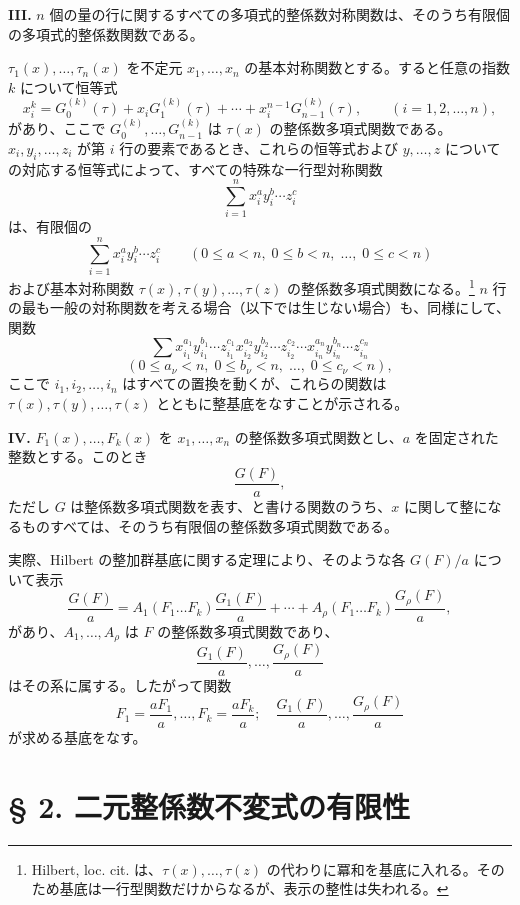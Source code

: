 \textbf{III.} \(n\) 個の量の行に関するすべての多項式的整係数対称関数は、そのうち有限個の多項式的整係数関数である。

\(\tau_1(x),\ldots,\tau_n(x)\) を不定元 \(x_1,\ldots,x_n\) の基本対称関数とする。すると任意の指数 \(k\) について恒等式
\[
        x_i^k = G_0^{(k)}(\tau)+x_iG_1^{(k)}(\tau)+\cdots+x_i^{n-1}G_{n-1}^{(k)}(\tau),
        \qquad (i=1,2,\ldots,n),
\]
があり、ここで \(G_0^{(k)},\ldots,G_{n-1}^{(k)}\) は \(\tau(x)\) の整係数多項式関数である。\(x_i,y_i,\ldots,z_i\) が第 \(i\) 行の要素であるとき、これらの恒等式および \(y,\ldots,z\) についての対応する恒等式によって、すべての特殊な一行型対称関数
\[
        \sum_{i=1}^n x_i^{a}y_i^{b}\cdots z_i^{c}
\]
は、有限個の
\[
        \sum_{i=1}^n x_i^{a}y_i^{b}\cdots z_i^{c}
        \qquad
        (0\le a<n,\;0\le b<n,\;\ldots,\;0\le c<n)
\]
および基本対称関数 \(\tau(x),\tau(y),\ldots,\tau(z)\) の整係数多項式関数になる。\footnote{Hilbert, loc. cit. は、\(\tau(x),\ldots,\tau(z)\) の代わりに冪和を基底に入れる。そのため基底は一行型関数だけからなるが、表示の整性は失われる。}
\(n\) 行の最も一般の対称関数を考える場合（以下では生じない場合）も、同様にして、関数
\[
        \sum x_{i_1}^{a_1}y_{i_1}^{b_1}\cdots z_{i_1}^{c_1}
              x_{i_2}^{a_2}y_{i_2}^{b_2}\cdots z_{i_2}^{c_2}
              \cdots
              x_{i_n}^{a_n}y_{i_n}^{b_n}\cdots z_{i_n}^{c_n}
\]
\[
        (0\le a_\nu<n,\;0\le b_\nu<n,\;\ldots,\;0\le c_\nu<n),
\]
ここで \(i_1,i_2,\ldots,i_n\) はすべての置換を動くが、これらの関数は \(\tau(x),\tau(y),\ldots,\tau(z)\) とともに整基底をなすことが示される。

\textbf{IV.} \(F_1(x),\ldots,F_k(x)\) を \(x_1,\ldots,x_n\) の整係数多項式関数とし、\(a\) を固定された整数とする。このとき
\[
        \frac{G(F)}{a},
\]
ただし \(G\) は整係数多項式関数を表す、と書ける関数のうち、\(x\) に関して整になるものすべては、そのうち有限個の整係数多項式関数である。

実際、Hilbert の整加群基底に関する定理により、そのような各 \(G(F)/a\) について表示
\[
 \frac{G(F)}{a}
 =
 A_1(F_1\ldots F_k)\frac{G_1(F)}{a}
 +\cdots+
 A_\rho(F_1\ldots F_k)\frac{G_\rho(F)}{a},
\]
があり、\(A_1,\ldots,A_\rho\) は \(F\) の整係数多項式関数であり、
\[
        \frac{G_1(F)}{a},\ldots,\frac{G_\rho(F)}{a}
\]
はその系に属する。したがって関数
\[
        F_1=\frac{aF_1}{a},\ldots,F_k=\frac{aF_k}{a};
        \quad
        \frac{G_1(F)}{a},\ldots,\frac{G_\rho(F)}{a}
\]
が求める基底をなす。

\setcounter{equation}{0}
\section*{§ 2. 二元整係数不変式の有限性}

